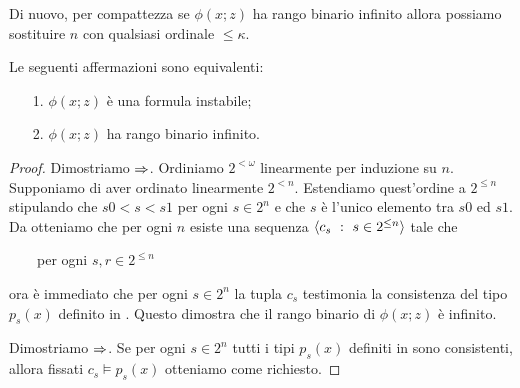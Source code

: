 Di nuovo, per compattezza se $\phi(x;z)$ ha rango binario infinito allora possiamo sostituire $n$ con qualsiasi ordinale $\le\kappa$.

\begin{proposition}
Le seguenti affermazioni sono equivalenti:
\begin{itemize}
\item[1.] $\phi(x;z)$ \`e una formula instabile;
\item[2.] $\phi(x;z)$ ha rango binario infinito.
\end{itemize}
\end{proposition}
\begin{proof}
Dimostriamo $\Rightarrow$. Ordiniamo $2^{<\omega}$ linearmente per induzione su $n$. Supponiamo di aver ordinato linearmente $2^{<n}$. Estendiamo quest'ordine a $2^{\le n}$ stipulando che $s0<s<s1$ per ogni $s\in2^n$ e che $s$ \`e l'unico elemento tra $s0$ ed $s1$. Da  otteniamo che per ogni $n$ esiste una sequenza $\langle c_s\ :\ s\in2^{\le n}\rangle$ tale che

 \ \ \ \ per ogni $s,r\in 2^{\le n}$

ora \`e immediato che per ogni $s\in 2^n$ la tupla $c_s$ testimonia la consistenza del tipo $p_s(x)$ definito in . Questo dimostra che il rango binario di $\phi(x;z)$ \`e infinito. 

Dimostriamo $\Rightarrow$. Se per ogni $s\in 2^n$ tutti i tipi $p_s(x)$ definiti in  sono consistenti, allora fissati $c_s\models p_s(x)$ otteniamo \ssf{\#} come richiesto.
\end{proof}

